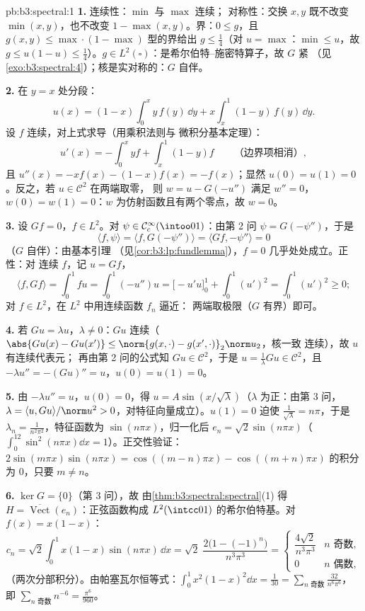 \begin{solution}{pb:b3:spectral:1}
\textbf{1.} 连续性：$\min$ 与 $\max$ 连续；
对称性：交换 $x, y$ 既不改变 $\min(x,y)$，也不改变 $1 -
\max(x,y)$。界：$0 \leq g$，且 $g(x,y) \leq
\max\cdot(1-\max)$ 型的界给出 $g \leq \frac14$（对 $u
= \max$：$\min \leq u$，故 $g \leq u(1-u) \leq \frac14$）。$g
\in L^2(\square)$：是希尔伯特–施密特算子，故 $G$ 紧
（见\cref{exo:b3:spectral:4}）；核是实对称的：$G$
自伴。

\textbf{2.} 在 $y = x$ 处分段：
\[
u(x) = (1 - x)\int_0^x y\,f(y)\,\dd y +
x\int_x^1(1 - y)\,f(y)\,\dd y .
\]
设 $f$ 连续，对上式求导（用乘积法则与
微积分基本定理）：
\[
u'(x) = -\int_0^xyf + \int_x^1(1-y)f
\qquad\text{（边界项相消）},
\]
且 $u''(x) = -xf(x) - (1 - x)f(x) = -f(x)$；显然 $u(0) =
u(1) = 0$。反之，若 $u \in \mathcal C^2$ 在两端取零，
则 $w = u - G(-u'')$ 满足 $w'' = 0$，$w(0) = w(1) =
0$：$w$ 为仿射函数且有两个零点，故 $w = 0$。

\textbf{3.} 设 $Gf = 0$，$f \in L^2$。对 $\psi \in \mathcal
C_c^\infty(\intoo01)$：由第 2 问 $\psi = G(-\psi'')$，于是
\[
\langle f, \psi\rangle = \langle f, G(-\psi'')\rangle
= \langle Gf, -\psi''\rangle = 0
\]
（$G$ 自伴）：由基本引理
（见\cref{cor:b3:lp:fundlemma}），$f = 0$ 几乎处处成立。正性：对
连续 $f$，记 $u = Gf$，
\[
\langle f, Gf\rangle = \int_0^1 fu = \int_0^1(-u'')u
= \bigl[-u'u\bigr]_0^1 + \int_0^1(u')^2 = \int_0^1(u')^2
\geq 0 ;
\]
对 $f \in L^2$，在 $L^2$ 中用连续函数 $f_n$ 逼近：
两端取极限（$G$ 有界）即可。

\textbf{4.} 若 $Gu = \lambda u$，$\lambda \neq 0$：$Gu$
连续（$\abs{Gu(x) - Gu(x')} \leq \norm{g(x,\cdot) -
g(x',\cdot)}_2\norm u_2$，核一致
连续），故 $u$ 有连续代表元；
再由第 2 问的公式知 $Gu \in \mathcal C^2$，于是 $u =
\frac1\lambda Gu \in \mathcal C^2$，且 $-\lambda u'' =
-(Gu)'' = u$，$u(0) = u(1) = 0$。

\textbf{5.} 由 $-\lambda u'' = u$，$u(0) = 0$，得 $u = A\sin(x/\sqrt
\lambda)$（$\lambda$ 为正：由第 3 问，$\lambda =
\langle u, Gu\rangle/\norm u^2 > 0$，对特征向量成立）。$u(1) =
0$ 迫使 $\frac1{\sqrt\lambda} = n\pi$，于是 $\lambda_n =
\frac1{n^2\pi^2}$，特征函数为 $\sin(n\pi x)$，归一化后
$e_n = \sqrt2\sin(n\pi x)$（$\int_0^12\sin^2(n\pi x)\dd x =
1$）。正交性验证：$2\sin(m\pi x)\sin(n\pi x) =
\cos((m-n)\pi x) - \cos((m+n)\pi x)$ 的积分为 $0$，只要 $m
\neq n$。

\textbf{6.} $\ker G = \{0\}$（第 3 问），故
由\cref{thm:b3:spectral:spectral}(1) 得 $H =
\overline{\operatorname{Vect}}(e_n)$：正弦函数构成
$L^2(\intcc01)$ 的希尔伯特基。对 $f(x) = x(1 - x)$：
\[
c_n = \sqrt2\int_0^1x(1-x)\sin(n\pi x)\,\dd x
= \sqrt2\;\frac{2\bigl(1 - (-1)^n\bigr)}{n^3\pi^3}
= \begin{cases}\dfrac{4\sqrt2}{n^3\pi^3} & n \text{ 奇数},\\
0 & n \text{ 偶数},\end{cases}
\]
（两次分部积分）。由帕塞瓦尔恒等式：$\int_0^1x^2(1-x)^2\dd
x = \frac1{30} = \sum_{n \text{ 奇数}}\frac{32}{n^6\pi^6}$，
即 $\sum_{n\text{ 奇数}}n^{-6} = \frac{\pi^6}{960}$。


\end{solution}
